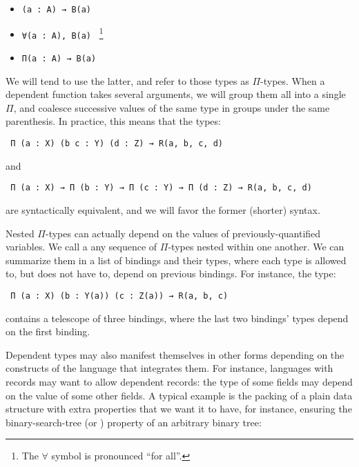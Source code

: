 \begin{itemize}

  \item \texttt{(a : A) → B(a)} %

  \item \texttt{∀(a : A), B(a)}
        ~\footnote{The $\forall$ symbol is pronounced ``for all''.}

  \item \texttt{Π(a : A) → B(a)} %

\end{itemize}

We will tend to use the latter, and refer to those types as $\Pi$-types.  When a
dependent function takes several arguments, we will group them all into a single
$\Pi$, and coalesce successive values of the same type in groups under the same
parenthesis.  In practice, this means that the types:

\texttt{
  Π (a : X) (b c : Y) (d : Z) → R(a, b, c, d)
}

and

\texttt{
  Π (a : X) → Π (b : Y) → Π (c : Y) → Π (d : Z) → R(a, b, c, d)
}

are syntactically equivalent, and we will favor the former (shorter) syntax.


Nested $\Pi$-types can actually depend on the values of previously-quantified
variables.  We call a  any sequence of $\Pi$-types
nested within one another.  We can summarize them in a list of bindings and
their types, where each type is allowed to, but does not have to, depend on
previous bindings.  For instance, the type:

\texttt{
  Π (a : X) (b : Y(a)) (c : Z(a)) → R(a, b, c)
}

contains a telescope of three bindings, where the last two bindings' types
depend on the first binding.

Dependent types may also manifest themselves in other forms depending on the
constructs of the language that integrates them.  For instance, languages with
records may want to allow dependent records: the type of some fields may depend
on the value of some other fields.  A typical example is the packing of a plain data structure with extra properties that we want it to have, for instance, ensuring the binary-search-tree (or ) property of an arbitrary binary tree:


